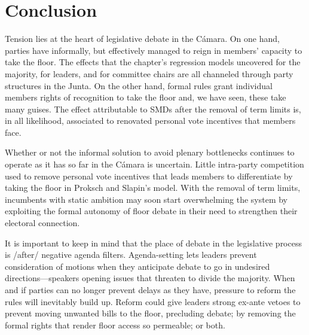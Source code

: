 \documentclass[letter,12pt]{article}
\begin{document}
\section{Conclusion} %

Tension lies at the heart of legislative debate in the Cámara. On one hand, parties have informally, but effectively managed to reign in members' capacity to take the floor. The effects that the chapter's regression models uncovered for the majority, for leaders, and for committee chairs are all channeled through party structures in the Junta. On the other hand, formal rules grant individual members rights of recognition to take the floor and, we have seen, these take many guises. The effect attributable to SMDs after the removal of term limits is, in all likelihood, associated to renovated personal vote incentives that members face. 

Whether or not the informal solution to avoid plenary bottlenecks continues to operate as it has so far in the Cámara is uncertain. Little intra-party competition used to remove personal vote incentives that leads members to differentiate by taking the floor in Proksch and Slapin's model. With the removal of term limits, incumbents with static ambition may soon start overwhelming the system by exploiting the formal autonomy of floor debate in their need to strengthen their electoral connection.

It is important to keep in mind that the place of debate in the legislative process is /after/ negative agenda filters. Agenda-setting lets leaders prevent consideration of motions when they anticipate debate to go in undesired directions---speakers opening issues that threaten to divide the majority. When and if parties can no longer prevent delays as they have, pressure to reform the rules will inevitably build up. Reform could give leaders strong ex-ante vetoes to prevent moving unwanted bills to the floor, precluding debate; by removing the formal rights that render floor access so permeable; or both. 


\end{document}
